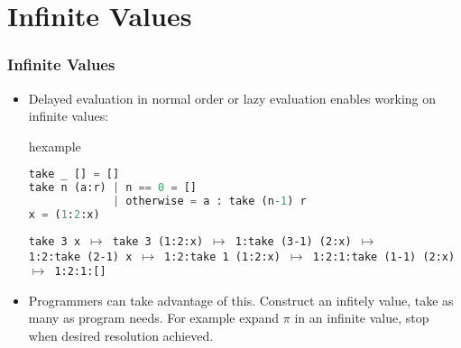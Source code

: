 \section{Infinite Values}
\begin{frame}[fragile]
\frametitle{Infinite Values}
\begin{itemize}
\item Delayed evaluation in normal order or lazy evaluation enables working on infinite values:
\begin{beamercolorbox}{hexample}
\begin{lstlisting}[language=Python]
take _ [] = []
take n (a:r) | n == 0 = []
             | otherwise = a : take (n-1) r
x = (1:2:x)
\end{lstlisting}
\texttt{\scriptsize take 3 x $\mapsto$ take 3 (1:2:x) $\mapsto$ 1:take (3-1) (2:x) $\mapsto$ \\
1:2:take (2-1) x $\mapsto$ 1:2:take 1 (1:2:x) $\mapsto$ 1:2:1:take (1-1) (2:x)
$\mapsto$ 1:2:1:[]}
\end{beamercolorbox}
\item Programmers can take advantage of this. Construct an infitely value, take as many as program needs. For example expand $\pi$ in an infinite value, stop when desired resolution achieved.
\end{itemize}
\end{frame}

